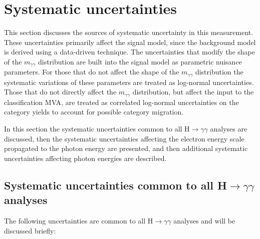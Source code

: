 \section{Systematic uncertainties}
\label{sec:syst_unc}

This section discusses the sources of systematic uncertainty in this measurement. These uncertainties primarily affect the signal model, since the background model is derived using a data-driven technique. The uncertainties that modify the shape of the $m_{\gamma\gamma}$ distribution are built into the signal model as parametric nuisance parameters. For those that do not affect the shape of the $m_{\gamma\gamma}$ distribution the systematic variations of these parameters are treated as log-normal uncertainties. Those that do not directly affect the $m_{\gamma\gamma}$ distribution, but affect the input to the classification MVA, are treated as correlated log-normal uncertainties on the category yields to account for possible category migration. 

In this section the systematic uncertainties common to all H$\rightarrow\gamma\gamma$ analyses are discussed, then the systematic uncertainties affecting the electron energy scale propagated to the photon energy are presented, and then additional systematic uncertainties affecting photon energies are described.

\subsection{Systematic uncertainties common to all H$\rightarrow\gamma\gamma$ analyses}

The following uncertainties are common to all H$\rightarrow\gamma\gamma$ analyses and will be discussed briefly:

